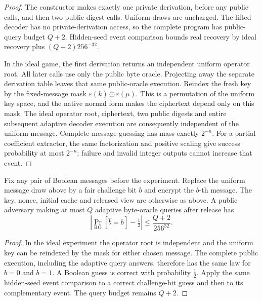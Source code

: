\begin{proof}
The constructor makes exactly one private derivation, before any public
calls, and then two public digest calls. Uniform draws are uncharged. The
lifted decoder has no private-derivation access, so the complete program
has public-query budget \(Q+2\). Hidden-seed event comparison bounds real
recovery by ideal recovery plus \((Q+2)256^{-32}\).

In the ideal game, the first derivation returns an independent uniform
operator root. All later calls use only the public byte oracle. Projecting
away the separate derivation table leaves that same public-oracle execution.
Reindex the fresh key by the fixed-message mask
\(\varepsilon(k)\mathbin\odot\varepsilon(\mu)\). This is a permutation of the uniform
key space, and the native normal form makes the ciphertext depend only on
this mask. The ideal operator root, ciphertext, two public digests and
entire subsequent adaptive decoder execution are consequently independent
of the uniform message. Complete-message guessing has mass exactly
\(2^{-n}\). For a partial coefficient extractor, the same factorization and
positive scaling give success probability at most \(2^{-n}\); failure and
invalid integer outputs cannot increase that event.
\end{proof}

\begin{theorem}
\label{thm:coupled-native-rom-challenge}
Fix any pair of Boolean messages before the experiment. Replace the uniform
message draw above by a fair challenge bit \(b\) and encrypt the \(b\)-th
message. The key, nonce, initial cache and released view are otherwise as
above. A public adversary making at most \(Q\) adaptive byte-oracle queries
after release has
\[
 \left|\Pr_{\mathrm{RO}}[\widehat b=b]-\tfrac12\right|
 \leq \frac{Q+2}{256^{32}}.
\]
\end{theorem}

\begin{proof}
In the ideal experiment the operator root is independent and the uniform
key can be reindexed by the mask for either chosen message. The complete
public execution, including the adaptive query answers, therefore has the
same law for \(b=0\) and \(b=1\). A Boolean guess is correct with probability
\(\tfrac12\). Apply the same hidden-seed event comparison to a correct
challenge-bit guess and then to its complementary event. The query budget
remains \(Q+2\).
\end{proof}

